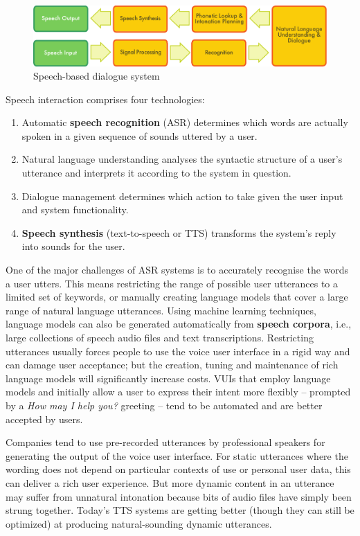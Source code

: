 \begin{multicols}{2}
\begin{figure}[htb]
  \center
  \includegraphics[width=\textwidth]{../_media/english/simple_speech-based_dialogue_architecture}
  \caption{Speech-based dialogue system}
  \label{fig:dialoguearch_en}
\end{figure}

Speech interaction comprises four technologies:
\begin{enumerate}
  \item Automatic \textbf{speech recognition} (ASR) determines which words are actually spoken in a given sequence of sounds uttered by a user.  
  \columnbreak
  \item Natural language understanding analyses the syntactic structure of a user’s utterance and interprets it according to the system in question.
  \item Dialogue management determines which action to take given the user input and system functionality.   
  \item \textbf{Speech synthesis} (text-to-speech or TTS) transforms the system’s reply into sounds for the user.
\end{enumerate}

One of the major challenges of ASR systems is to accurately recognise the words a user utters. This means restricting the range of possible user utterances to a limited set of keywords, or manually creating language models that cover a large range of natural language utterances. Using machine learning techniques, language models can also be generated automatically from \textbf{speech corpora}, i.e., large collections of speech audio files and text transcriptions. Restricting utterances usually forces people to use the voice user interface in a rigid way and can damage user acceptance; but the creation, tuning and maintenance of rich language models will significantly increase costs. VUIs that employ language models and initially allow a user to express their intent more flexibly -- prompted by a \textit{How may I help you?} greeting -- tend to be automated and are better accepted by users. 

Companies tend to use pre-recorded utterances by professional speakers for generating the output of the voice user interface. For static utterances where the wording does not depend on particular contexts of use or personal user data, this can deliver a rich user experience. But more dynamic content in an utterance may suffer from unnatural intonation because bits of audio files have simply been strung together. Today’s TTS systems are getting better (though they can still be optimized) at producing natural-sounding dynamic utterances.  


\end{multicols}
